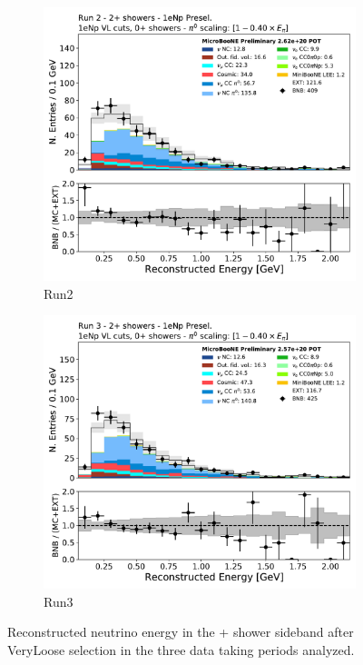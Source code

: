 \begin{figure}[H]
\begin{center}
\begin{subfigure}{0.32\textwidth}
    \includegraphics[width=1.00\textwidth]{Sidebands/Figures/1eNp/TimeDependence/reco_e_TwoPShr_NPVL_Run2.pdf}
    \caption{Run2}
    \end{subfigure}
    \begin{subfigure}{0.32\textwidth}
    \includegraphics[width=1.00\textwidth]{Sidebands/Figures/1eNp/TimeDependence/reco_e_TwoPShr_NPVL_Run3.pdf}
    \caption{Run3}
    \end{subfigure}
    \caption{\label{fig:sb:1eNp:time:twopshr:vl:recoe} Reconstructed neutrino energy in the + shower sideband after VeryLoose selection in the three data taking periods analyzed.}
    \end{center}
\end{figure}

